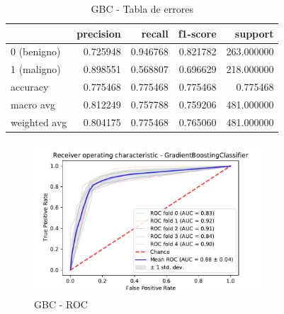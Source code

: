 \documentclass[12pt,twoside]{report}
\begin{document}
\begin{table}[htp]
\begin{center}
\begin{tabular}{lrrrr}
\toprule
{} &  precision &    recall &  f1-score &     support \\
\midrule
0 (benigno) &   0.725948 &  0.946768 &  0.821782 &  263.000000 \\
1 (maligno) &   0.898551 &  0.568807 &  0.696629 &  218.000000 \\
accuracy     &   0.775468 &  0.775468 &  0.775468 &    0.775468 \\
macro avg    &   0.812249 &  0.757788 &  0.759206 &  481.000000 \\
weighted avg &   0.804175 &  0.775468 &  0.765060 &  481.000000 \\
\bottomrule
\end{tabular}
\end{center}
\caption{GBC - Tabla de errores}
\label{gbc:precision}
\end{table}

\begin{figure}[htp]
\begin{center}
\includegraphics[width=8.5cm]{./code/figures_python/roc/gbc.pdf}%
\end{center}
 \caption{GBC - ROC}
 \label{gbc:roc}
 \end{figure}
 
\end{document}
